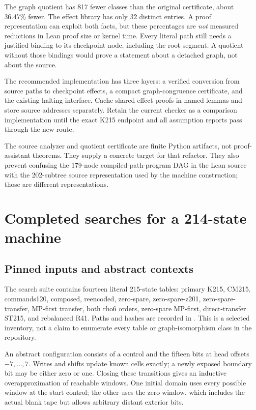 \documentclass[11pt,letterpaper]{article}
\theoremstyle{definition}
\begin{document}
The graph quotient has 817 fewer classes than the original certificate,
about 36.47\% fewer. The effect library has only 32 distinct entries. A
proof representation can exploit both facts, but these percentages are
\emph{not} measured reductions in Lean proof size or kernel time.
Every literal path still needs a justified binding to its checkpoint
node, including the root segment. A quotient without those bindings
would prove a statement about a detached graph, not about the source.

The recommended implementation has three layers: a verified conversion
from source paths to checkpoint effects, a compact graph-congruence
certificate, and the existing halting interface. Cache shared effect
proofs in named lemmas and store source addresses separately. Retain the
current checker as a comparison implementation until the exact K215
endpoint and all assumption reports pass through the new route.

The source analyzer and quotient certificate are finite Python artifacts,
not proof-assistant theorems. They supply a concrete target for that
refactor. They also prevent confusing the 179-node compiled path-program
DAG in the Lean source with the 202-subtree source representation used
by the machine construction; those are different representations.

\section{Completed searches for a 214-state machine}

\subsection{Pinned inputs and abstract contexts}

The search suite contains fourteen literal 215-state tables: primary
K215, CM215, commands120, composed, reencoded, zero-spare, zero-spare-z201,
zero-spare-transfer, MP-first transfer, both rho6 orders, zero-spare
MP-first, direct-transfer ST215, and rebalanced R41. Paths and hashes
are recorded in . This is a selected
inventory, not a claim to enumerate every table or graph-isomorphism
class in the repository.

An abstract configuration consists of a control and the fifteen bits
at head offsets $-7,\ldots,7$. Writes and shifts update known cells
exactly; a newly exposed boundary bit may be either zero or one. Closing
these transitions gives an inductive overapproximation of reachable
windows. One initial domain uses every possible window at the start
control; the other uses the zero window, which includes the actual blank
tape but allows arbitrary distant exterior bits.
\end{document}
